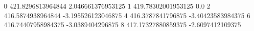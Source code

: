 0 421.8296813964844 2.046661376953125
1 419.78302001953125 0.0
2 416.5874938964844 -3.195526123046875
4 416.3787841796875 -3.40423583984375
6 416.74407958984375 -3.0389404296875
8 417.17327880859375 -2.6097412109375
